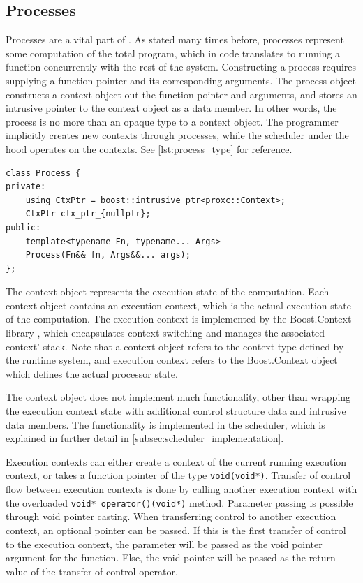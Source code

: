 \subsection{Processes}
\label{subsec:process_implementation}


Processes are a vital part of \Proxc{}. As stated many times before, processes represent some computation of the total program, which in code translates to running a function concurrently with the rest of the system. Constructing a process requires supplying a function pointer and its corresponding arguments. The process object constructs a context object out the function pointer and arguments, and stores an intrusive pointer to the context object as a data member. In other words, the process is no more than an opaque type to a context object. The programmer implicitly creates new contexts through processes, while the scheduler under the hood operates on the contexts. See \cref{lst:process_type} for reference.

\begin{lstfloat}
\begin{lstlisting}[caption={Minimal process type.}, label={lst:process_type}, style={CustomC++}, xleftmargin={2em}]
class Process {
private:
    using CtxPtr = boost::intrusive_ptr<proxc::Context>;
    CtxPtr ctx_ptr_{nullptr};
public:
    template<typename Fn, typename... Args>
    Process(Fn&& fn, Args&&... args);
};
\end{lstlisting}
\end{lstfloat}

The context object represents the execution state of the computation. Each context object contains an execution context, which is the actual execution state of the computation. The execution context is implemented by the Boost.Context library \citep{kowalke2017boost}, which encapsulates context switching and manages the associated context' stack. Note that a context object refers to the context type defined by the runtime system, and execution context refers to the Boost.Context object which defines the actual processor state.

The context object does not implement much functionality, other than wrapping the execution context state with additional control structure data and intrusive data members. The functionality is implemented in the scheduler, which is explained in further detail in \cref{subsec:scheduler_implementation}.

Execution contexts can either create a context of the current running execution context, or takes a function pointer of the type \lstinline[style={CustomC++}]|void(void*)|. Transfer of control flow between execution contexts is done by calling another execution context with the overloaded \lstinline[style={CustomC++}]|void* operator()(void*)| method. Parameter passing is possible through void pointer casting. When transferring control to another execution context, an optional pointer can be passed. If this is the first transfer of control to the execution context, the parameter will be passed as the void pointer argument for the function. Else, the void pointer will be passed as the return value of the transfer of control operator.

